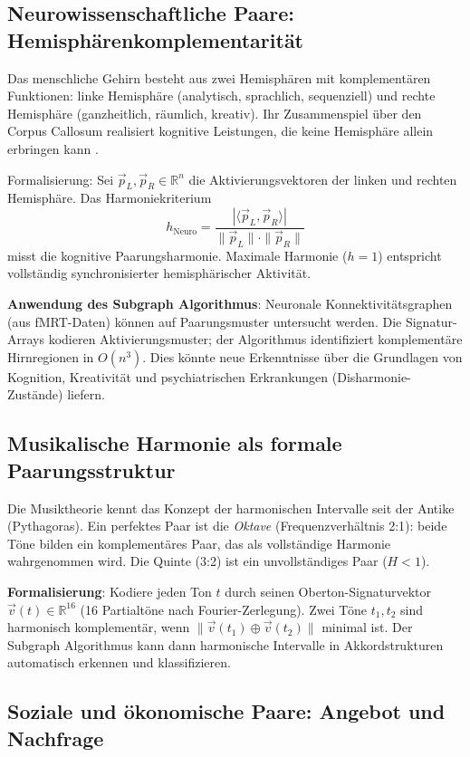 ﻿\documentclass[a4paper,12pt]{article}
\theoremstyle{definition}
\begin{document}
\subsection{Neurowissenschaftliche Paare: Hemisphärenkomplementarität}

Das menschliche Gehirn besteht aus zwei Hemisphären mit komplementären
Funktionen: linke Hemisphäre (analytisch, sprachlich, sequenziell) und
rechte Hemisphäre (ganzheitlich, räumlich, kreativ). Ihr Zusammenspiel über
den Corpus Callosum realisiert kognitive Leistungen, die keine Hemisphäre
allein erbringen kann \cite{weyl1952}.

Formalisierung: Sei $\vec{p}_L, \vec{p}_R \in \mathbb{R}^n$ die Aktivierungsvektoren
der linken und rechten Hemisphäre. Das Harmoniekriterium
\[
	h_{\mathrm{Neuro}} = \frac{|\langle \vec{p}_L, \vec{p}_R \rangle|}
	{\|\vec{p}_L\| \cdot \|\vec{p}_R\|}
\]
misst die kognitive Paarungsharmonie. Maximale Harmonie ($h = 1$) entspricht
vollständig synchronisierter hemisphärischer Aktivität.

\textbf{Anwendung des Subgraph Algorithmus}: Neuronale Konnektivitätsgraphen
(aus fMRT-Daten) können auf Paarungsmuster untersucht werden. Die Signatur-Arrays
kodieren Aktivierungsmuster; der Algorithmus identifiziert komplementäre
Hirnregionen in $O(n^3)$. Dies könnte neue Erkenntnisse über die Grundlagen
von Kognition, Kreativität und psychiatrischen Erkrankungen (Disharmonie-Zustände)
liefern.

\subsection{Musikalische Harmonie als formale Paarungsstruktur}

Die Musiktheorie kennt das Konzept der harmonischen Intervalle seit der Antike
(Pythagoras). Ein perfektes Paar ist die \emph{Oktave} (Frequenzverhältnis 2:1):
beide Töne bilden ein komplementäres Paar, das als vollständige Harmonie
wahrgenommen wird. Die Quinte (3:2) ist ein unvollständiges Paar ($H < 1$).

\textbf{Formalisierung}: Kodiere jeden Ton $t$ durch seinen Oberton-Signaturvektor
$\vec{v}(t) \in \mathbb{R}^{16}$ (16 Partialtöne nach Fourier-Zerlegung).
Zwei Töne $t_1, t_2$ sind harmonisch komplementär, wenn
$\|\vec{v}(t_1) \oplus \vec{v}(t_2)\|$ minimal ist.
Der Subgraph Algorithmus kann dann harmonische Intervalle in Akkordstrukturen
automatisch erkennen und klassifizieren.

\subsection{Soziale und ökonomische Paare: Angebot und Nachfrage}
\end{document}
